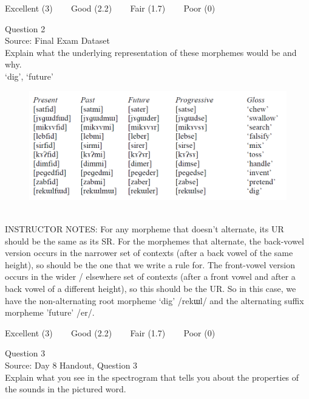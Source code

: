 \documentclass[12pt]{article}
\begin{document}
\vfill
Excellent (3) ~~~ Good (2.2) ~~~ Fair (1.7) ~~~ Poor (0)
\newpage

{\large Question 2}\\

Source: Final Exam Dataset\\

Explain what the underlying representation of these morphemes would be and why.\\

`dig', `future'

\begin{figure}[H]
\includegraphics{../images/final_dataset.png}
\end{figure}

~\\
INSTRUCTOR NOTES: For any morpheme that doesn’t alternate, its UR should be the same as its SR.  For the morphemes that alternate, the back-vowel version occurs in the narrower set of contexts (after a back vowel of the same height), so should be the one that we write a rule for. The front-vowel version occurs in the wider / elsewhere set of contexts (after a front vowel and after a back vowel of a different height), so this should be the UR. So in this case, we have the non-alternating root morpheme ‘dig’ /rekɯl/ and the alternating suffix morpheme 'future' /er/.


\vfill
Excellent (3) ~~~ Good (2.2) ~~~ Fair (1.7) ~~~ Poor (0)
\newpage

{\large Question 3}\\

Source: Day 8 Handout, Question 3\\

Explain what you see in the spectrogram that tells you about the properties of the sounds in the pictured word.\\
\end{document}
